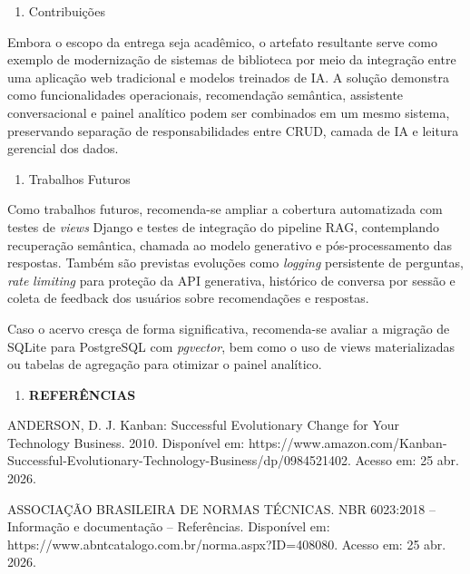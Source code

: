 \documentclass[
]{article}
\begin{document}
\begin{enumerate}
\def\labelenumi{\arabic{enumi}.}
\setcounter{enumi}{1}
\item
  \protect{}\label{_Toc230227836}{}Contribuições
\end{enumerate}

Embora o escopo da entrega seja acadêmico, o artefato resultante serve
como exemplo de modernização de sistemas de biblioteca por meio da
integração entre uma aplicação web tradicional e modelos treinados de
IA. A solução demonstra como funcionalidades operacionais, recomendação
semântica, assistente conversacional e painel analítico podem ser
combinados em um mesmo sistema, preservando separação de
responsabilidades entre CRUD, camada de IA e leitura gerencial dos
dados.

\begin{enumerate}
\def\labelenumi{\arabic{enumi}.}
\setcounter{enumi}{2}
\item
  \protect{}\label{_Toc230227837}{}Trabalhos Futuros
\end{enumerate}

Como trabalhos futuros, recomenda-se ampliar a cobertura automatizada
com testes de \emph{views} Django e testes de integração do pipeline
RAG, contemplando recuperação semântica, chamada ao modelo generativo e
pós-processamento das respostas. Também são previstas evoluções como
\emph{logging} persistente de perguntas, \emph{rate} \emph{limiting}
para proteção da API generativa, histórico de conversa por sessão e
coleta de feedback dos usuários sobre recomendações e respostas.

Caso o acervo cresça de forma significativa, recomenda-se avaliar a
migração de SQLite para PostgreSQL com \emph{pgvector}, bem como o uso
de views materializadas ou tabelas de agregação para otimizar o painel
analítico.

\begin{enumerate}
\def\labelenumi{\arabic{enumi}.}
\setcounter{enumi}{10}
\item
  \textbf{REFERÊNCIAS}
\end{enumerate}

ANDERSON, D. J. Kanban: Successful Evolutionary Change for Your
Technology Business. 2010. Disponível em:
https://www.amazon.com/Kanban-Successful-Evolutionary-Technology-Business/dp/0984521402.
Acesso em: 25 abr. 2026.

ASSOCIAÇÃO BRASILEIRA DE NORMAS TÉCNICAS. NBR 6023:2018 -- Informação e
documentação -- Referências. Disponível em:
https://www.abntcatalogo.com.br/norma.aspx?ID=408080. Acesso em: 25 abr.
2026.
\end{document}
